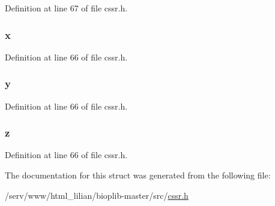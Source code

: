 Definition at line 67 of file cssr.\-h.

\hypertarget{structcssr__entry_ad14343030eb6dd7eb6a9c8b4c52fecb0}{
\subsubsection[{x}]{ x}}\label{structcssr__entry_ad14343030eb6dd7eb6a9c8b4c52fecb0}


Definition at line 66 of file cssr.\-h.

\hypertarget{structcssr__entry_a1aa467ce26c2e3301d0b78836e30cab0}{
\subsubsection[{y}]{ y}}\label{structcssr__entry_a1aa467ce26c2e3301d0b78836e30cab0}


Definition at line 66 of file cssr.\-h.

\hypertarget{structcssr__entry_a9195b0e2ec564479b8a02cc3357410b7}{
\subsubsection[{z}]{ z}}\label{structcssr__entry_a9195b0e2ec564479b8a02cc3357410b7}


Definition at line 66 of file cssr.\-h.



The documentation for this struct was generated from the following file\-:\begin{DoxyCompactItemize}
\item 
/serv/www/html\-\_\-lilian/bioplib-\/master/src/\hyperlink{cssr_8h}{cssr.\-h}\end{DoxyCompactItemize}
